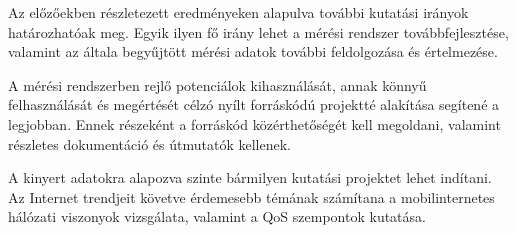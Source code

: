 Az előzőekben részletezett eredményeken alapulva további kutatási irányok határozhatóak meg. Egyik ilyen fő irány lehet a mérési rendszer továbbfejlesztése, valamint az általa begyűjtött mérési adatok további feldolgozása és értelmezése.

A mérési rendszerben rejlő potenciálok kihasználását, annak könnyű felhasználását és megértését célzó nyílt forráskódú projektté alakítása segítené a legjobban. Ennek részeként a forráskód közérthetőségét kell megoldani, valamint részletes dokumentáció és útmutatók kellenek.

A kinyert adatokra alapozva szinte bármilyen kutatási projektet lehet indítani. Az Internet trendjeit követve érdemesebb témának számítana a mobilinternetes hálózati viszonyok vizsgálata, valamint a QoS szempontok kutatása.



%

